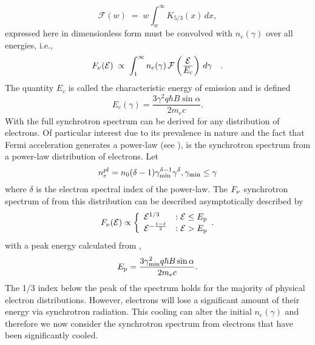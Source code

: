 \begin{equation}
  \mathcal{F}\left(w\right) \; =\; w \int_w^{\infty } K_{5/3}(x) \, dx,
  \label{eq:synch_func}
\end{equation}
expressed here in dimensionless form must be convolved with $n_e(\gamma)$ over all energies, i.e., 
\begin{equation}
  F_{\nu}(\mathcal{E})\; \propto\; \int_1^{\infty} n_e(\gamma ) \, 
  \mathcal{F} \left( \dover{\mathcal{E}}{E_c}\right) \, d\gamma\quad .
  \label{eq:synch_flux}
\end{equation}
The quantity $E_c$ is called the characteristic energy of emission and
is defined
\begin{equation}
  \label{eq:wc}
  E_c(\gamma) = \frac{3 \gamma^2q \hbar B \sin\alpha}{2 m_e c}.
\end{equation}
With  the full synchrotron
spectrum can be derived for any distribution of electrons. Of
particular interest  due to its prevalence in nature and the fact
that Fermi acceleration generates a power-law
(see ), is the synchrotron spectrum from a power-law
distribution of electrons. Let
\begin{equation}
  \label{eq:plelec}
  n_e^{pl}=n_0(\delta -1)\gamma_{\rm min}^{\delta-1}\gamma^{\delta}, \gamma_{\rm min} \leq \gamma
\end{equation}
where $\delta$ is the electron spectral index of the power-law. The $F_{\nu}$ synchrotron spectrum of from this distribution can be described asymptotically described by
\begin{equation}
  \label{eq:plsync}
  F_{\nu}(\mathcal{E})\propto\left\{
     \begin{array}{lr}
       \mathcal{E}^{1/3} & : \mathcal{E}\leq E_{\rm p}\\
       \mathcal{E}^{-\frac{1-\delta}{2}} & : \mathcal{E}>E_{\rm p}
     \end{array}.
   \right.
\end{equation}
with a peak energy calculated from ,
\begin{equation}
  \label{eq:synchPeak}
  E_{\rm p} = \frac{3 \gamma_{\rm min}^2 q \hbar B \sin{\alpha}}{2 m_e c}.
\end{equation}
The 1/3 index below the peak of the spectrum holds for the majority of
physical electron distributions. However, electrons will lose a
significant amount of their energy via synchrotron radiation. This
cooling can alter the initial $n_e(\gamma)$ and therefore we now
consider the synchrotron spectrum from electrons that have been
significantly cooled.

